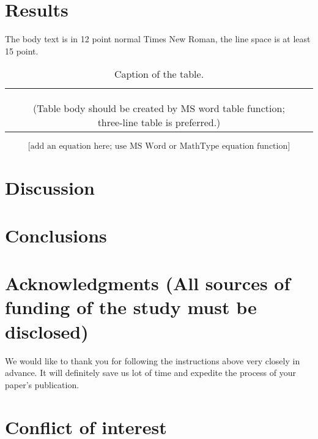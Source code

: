\documentclass{mbe}
\numberwithin{equation}{section}
\begin{document}
\section{Results}
The body text is in 12 point normal Times New Roman, 
the line space is at least 15 point.
 
\begin{table}[H]
\begin{center}
\caption{Caption of the table.}
\begin{tabular}{ccc} \hline
 & & \\\hline
 & & \\
 & & \\
 & & \\\hline
 &(Table body should be created by MS word table function; three-line table is preferred.)
\end{tabular}
\end{center}
\end{table}


\begin{equation}
  \text{[add an equation here; use MS Word or MathType equation function]}
\end{equation}

\section{Discussion}

\section{Conclusions}

\section*{Acknowledgments (All sources of funding of the study must be disclosed)}
We would like to thank you for following the instructions above 
very closely in advance. It will definitely save us lot of 
time and expedite the process of your paper's publication.

\section*{Conflict of interest}
\end{document}
